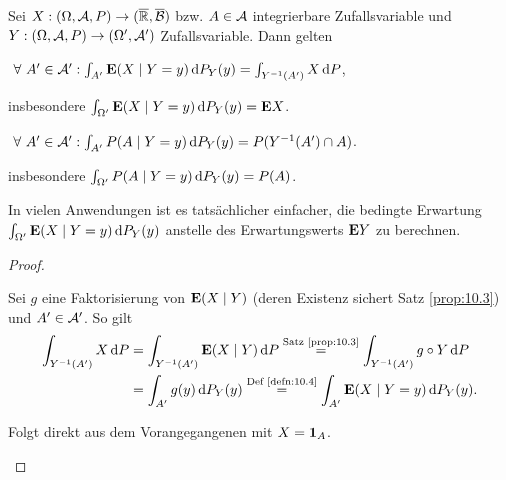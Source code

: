 \begin{prop}
\label{prop:10.4}
Sei $X: (\Omega, {\AA}, P)\to (\overline{\R},
\overline{\BB})$ bzw. $A\in {\AA}$ integrierbare Zufallsvariable und
$Y : (\Omega, {\AA},P)\to (\Omega ', {\AA }')$ Zufallsvariable. Dann gelten
\begin{propenum}
\item
$\forall {A' \in {\AA}'} : \int_{A'} \E(X\mid Y=y)
\dP_{Y}(y) =\int_{Y^ {-1}(A')} X\dP$,

insbesondere $\int_{\Omega '} \E( X \mid Y=y)\dP_{Y}(y) = \E X$.
\item
$\forall A'\in {\AA}' : \int_{A'} P(A\mid Y=y) \dP_{Y}(y)= P(Y^ {-1}
(A')\cap A)$.

insbesondere $\int_{\Omega '} P(A\mid Y=y)\dP_{Y}(y) = P(A)$.\fishhere
\end{propenum} 
\end{prop}

In vielen Anwendungen ist es tatsächlicher einfacher, die bedingte Erwartung
$\int_{\Omega '} \E( X \mid Y=y)\dP_{Y}(y)$ anstelle des Erwartungswerts
$\E Y$ zu berechnen.

\begin{proof}
\begin{proofenum}
\item Sei $g$ eine Faktorisierung von $\E(X\mid Y)$ (deren Existenz sichert
Satz \ref{prop:10.3}) und $A'\in\AA'$. So gilt
\begin{align*} 
\int_{Y^{-1}(A')} X \dP &= \int_{Y^{-1}(A')} \E(X\mid Y)\dP
 \overset{\text{Satz \ref{prop:10.3}}}{=} \int_{Y^{-1}(A')} g\circ Y\dP
 \\&= \int_{A'} g(y)\dP_Y(y)\overset{\text{Def \ref{defn:10.4}}}=
 \int_{A'} \E(X\mid Y=y) \dP_Y(y).
\end{align*}
\item Folgt direkt aus dem Vorangegangenen mit $X=\Id_A$.\qedhere
\end{proofenum}
\end{proof}

